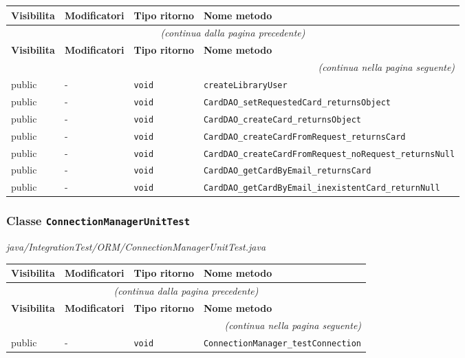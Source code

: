 \begin{longtable}{@{}llll@{}}
\toprule
\textbf{Visibilita} & \textbf{Modificatori} & \textbf{Tipo ritorno} & \textbf{Nome metodo} \\
\midrule
\endfirsthead
\multicolumn{4}{c}{\small\itshape (continua dalla pagina precedente)} \\
\toprule
\textbf{Visibilita} & \textbf{Modificatori} & \textbf{Tipo ritorno} & \textbf{Nome metodo} \\
\midrule
\endhead
\midrule
\multicolumn{4}{r}{\small\itshape (continua nella pagina seguente)} \\
\endfoot
\bottomrule
\endlastfoot
  public & - & \texttt{void} & \texttt{createLibraryUser} \\
  public & - & \texttt{void} & \texttt{CardDAO\_setRequestedCard\_returnsObject} \\
  public & - & \texttt{void} & \texttt{CardDAO\_createCard\_returnsObject} \\
  public & - & \texttt{void} & \texttt{CardDAO\_createCardFromRequest\_returnsCard} \\
  public & - & \texttt{void} & \texttt{CardDAO\_createCardFromRequest\_noRequest\_returnsNull} \\
  public & - & \texttt{void} & \texttt{CardDAO\_getCardByEmail\_returnsCard} \\
  public & - & \texttt{void} & \texttt{CardDAO\_getCardByEmail\_inexistentCard\_returnNull} \\
\end{longtable}

\subsubsection*{Classe \texttt{ConnectionManagerUnitTest}}\label{ConnectionManagerUnitTest}
{\small\textit{java/IntegrationTest/ORM/ConnectionManagerUnitTest.java}}
\vspace{4pt}

\begin{longtable}{@{}llll@{}}
\toprule
\textbf{Visibilita} & \textbf{Modificatori} & \textbf{Tipo ritorno} & \textbf{Nome metodo} \\
\midrule
\endfirsthead
\multicolumn{4}{c}{\small\itshape (continua dalla pagina precedente)} \\
\toprule
\textbf{Visibilita} & \textbf{Modificatori} & \textbf{Tipo ritorno} & \textbf{Nome metodo} \\
\midrule
\endhead
\midrule
\multicolumn{4}{r}{\small\itshape (continua nella pagina seguente)} \\
\endfoot
\bottomrule
\endlastfoot
  public & - & \texttt{void} & \texttt{ConnectionManager\_testConnection} \\
\end{longtable}


